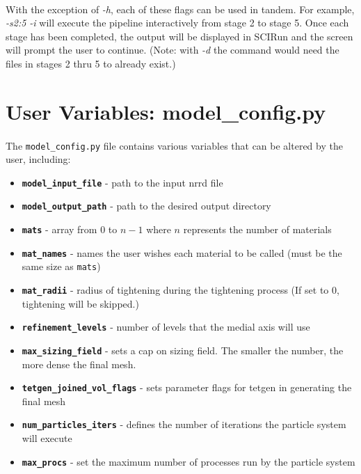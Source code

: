 \documentclass[fleqn,12pt,openany]{book}
\begin{document}
\paragraph{}
With the exception of \emph{-h}, each of these flags can be used in tandem. For example, \emph{-s2:5 -i} will execute the pipeline interactively from stage 2 to stage 5. Once each stage has been completed, the output will be displayed in SCIRun and the screen will prompt the user to continue. (Note: with \emph{-d} the command would need the files in stages 2 thru 5 to already exist.)


\section{User Variables: model\_config.py}

\paragraph{}
The \verb+model_config.py+ file contains various variables that can be altered by the user, including:
\begin{itemize} 
  \item{\bf \verb+model_input_file+} - path to the input nrrd file
  \item{\bf \verb+model_output_path+} - path to the desired output directory
  \item{\bf \verb+mats+} - array from 0 to $n - 1$ where $n$ represents the number of materials
  \item{\bf \verb+mat_names+} - names the user wishes each material to be called (must be the same size as \verb+mats+)
 \item{\bf \verb+mat_radii+} - radius of tightening during the tightening process (If set to 0, tightening will be skipped.)
 \item{\bf \verb+refinement_levels+} - number of levels that the medial axis will use
 \item{\bf \verb+max_sizing_field+} - sets a cap on sizing field. The smaller the number, the more dense the final mesh.
 \item{\bf \verb+tetgen_joined_vol_flags+} - sets parameter flags for tetgen in generating the final mesh
 \item{\bf \verb+num_particles_iters+} - defines the number of iterations the particle system will execute
 \item{\bf \verb+max_procs+} - set the maximum number of processes run by the particle system
\end{itemize}
\end{document}
